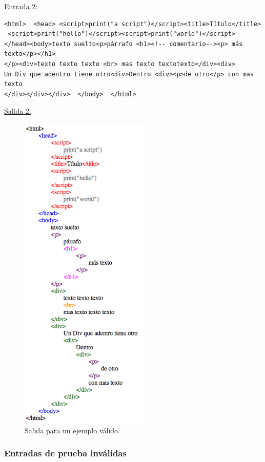 \newpage

\underline{Entrada 2:}

\begin{verbatim}
<html>  <head> <script>print("a script")</script><title>Título</title>
 <script>print("hello")</script><script>print("world")</script>
</head><body>texto suelto<p>párrafo <h1><!-- comentario--><p> más texto</p></h1>
</p><div>texto texto texto <br> mas texto textotexto</div><div>
Un Div que adentro tiene otro<div>Dentro <div><p>de otro</p> con mas texto
</div></div></div>  </body>  </html>
\end{verbatim}

\underline{Salida 2:}

\begin{figure}[h!]
\includegraphics[width=6.2cm]{img/ejemplo2.png}
      \caption{Salida para un ejemplo válido.}
      \label{salida2}
\end{figure}

\newpage 

\subsubsection{Entradas de prueba inválidas}

